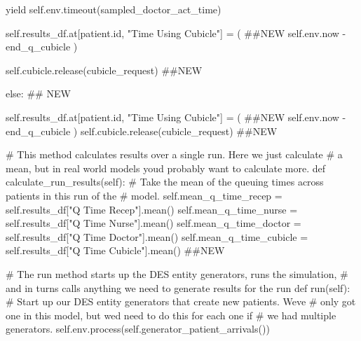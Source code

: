 \documentclass[
  letterpaper,
  DIV=11,
  numbers=noendperiod]{scrreprt}
\newenvironment{Shaded}{}{}
\newcommand{\BuiltInTok}[1]{\textcolor[rgb]{0.84,0.23,0.29}{#1}}
\newcommand{\CommentTok}[1]{\textcolor[rgb]{0.42,0.45,0.49}{#1}}
\newcommand{\ControlFlowTok}[1]{\textcolor[rgb]{0.84,0.23,0.29}{#1}}
\newcommand{\KeywordTok}[1]{\textcolor[rgb]{0.84,0.23,0.29}{#1}}
\newcommand{\NormalTok}[1]{\textcolor[rgb]{0.14,0.16,0.18}{#1}}
\newcommand{\OperatorTok}[1]{\textcolor[rgb]{0.14,0.16,0.18}{#1}}
\newcommand{\StringTok}[1]{\textcolor[rgb]{0.01,0.18,0.38}{#1}}
\newcommand{\VariableTok}[1]{\textcolor[rgb]{0.89,0.38,0.04}{#1}}
\begin{document}
\begin{tcolorbox}
\begin{Shaded}
\begin{Highlighting}[]
                \ControlFlowTok{yield} \VariableTok{self}\NormalTok{.env.timeout(sampled\_doctor\_act\_time)}

                \VariableTok{self}\NormalTok{.results\_df.at[patient.}\BuiltInTok{id}\NormalTok{, }\StringTok{"Time Using Cubicle"}\NormalTok{] }\OperatorTok{=}\NormalTok{ ( }\CommentTok{\#\#NEW}
                    \VariableTok{self}\NormalTok{.env.now }\OperatorTok{{-}}\NormalTok{ end\_q\_cubicle}
\NormalTok{                )}

                \VariableTok{self}\NormalTok{.cubicle.release(cubicle\_request) }\CommentTok{\#\#NEW}

        \ControlFlowTok{else}\NormalTok{: }\CommentTok{\#\# NEW}

            \VariableTok{self}\NormalTok{.results\_df.at[patient.}\BuiltInTok{id}\NormalTok{, }\StringTok{"Time Using Cubicle"}\NormalTok{] }\OperatorTok{=}\NormalTok{ (  }\CommentTok{\#\#NEW}
                  \VariableTok{self}\NormalTok{.env.now }\OperatorTok{{-}}\NormalTok{ end\_q\_cubicle}
\NormalTok{                  )}
            \VariableTok{self}\NormalTok{.cubicle.release(cubicle\_request) }\CommentTok{\#\#NEW}


    \CommentTok{\# This method calculates results over a single run.  Here we just calculate}
    \CommentTok{\# a mean, but in real world models you\textquotesingle{}d probably want to calculate more.}
    \KeywordTok{def}\NormalTok{ calculate\_run\_results(}\VariableTok{self}\NormalTok{):}
        \CommentTok{\# Take the mean of the queuing times across patients in this run of the}
        \CommentTok{\# model.}
        \VariableTok{self}\NormalTok{.mean\_q\_time\_recep }\OperatorTok{=} \VariableTok{self}\NormalTok{.results\_df[}\StringTok{"Q Time Recep"}\NormalTok{].mean()}
        \VariableTok{self}\NormalTok{.mean\_q\_time\_nurse }\OperatorTok{=} \VariableTok{self}\NormalTok{.results\_df[}\StringTok{"Q Time Nurse"}\NormalTok{].mean()}
        \VariableTok{self}\NormalTok{.mean\_q\_time\_doctor }\OperatorTok{=} \VariableTok{self}\NormalTok{.results\_df[}\StringTok{"Q Time Doctor"}\NormalTok{].mean()}
        \VariableTok{self}\NormalTok{.mean\_q\_time\_cubicle }\OperatorTok{=} \VariableTok{self}\NormalTok{.results\_df[}\StringTok{"Q Time Cubicle"}\NormalTok{].mean() }\CommentTok{\#\#NEW}

    \CommentTok{\# The run method starts up the DES entity generators, runs the simulation,}
    \CommentTok{\# and in turns calls anything we need to generate results for the run}
    \KeywordTok{def}\NormalTok{ run(}\VariableTok{self}\NormalTok{):}
        \CommentTok{\# Start up our DES entity generators that create new patients.  We\textquotesingle{}ve}
        \CommentTok{\# only got one in this model, but we\textquotesingle{}d need to do this for each one if}
        \CommentTok{\# we had multiple generators.}
        \VariableTok{self}\NormalTok{.env.process(}\VariableTok{self}\NormalTok{.generator\_patient\_arrivals())}


\end{Highlighting}
\end{Shaded}
\end{tcolorbox}
\end{document}
